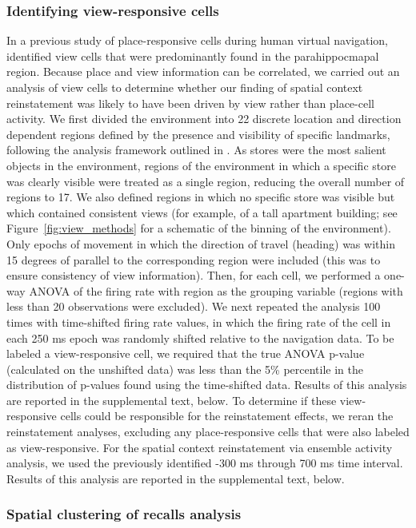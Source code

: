 \subsubsection*{Identifying view-responsive cells}
In a previous study of  place-responsive cells during human virtual navigation, \cite{EkstEtal03} identified view cells that were predominantly found in the parahippocmapal region.  Because place and view information can be correlated, we carried out an analysis of view cells to determine whether our finding of spatial context reinstatement was likely to have been driven by view rather than place-cell activity.  We first divided the environment into 22 discrete location and direction dependent regions defined by the presence and visibility of specific landmarks, following the analysis framework outlined in \cite{EkstEtal03}. As stores were the most salient objects in the environment, regions of the environment in which a specific store was clearly visible were treated as a single region, reducing the overall number of regions to 17. We also defined regions  in which no specific store was visible but which contained consistent views (for example, of a tall apartment building; see Figure~\ref{fig:view_methods} for a schematic of the binning of the environment).  Only epochs of movement in which the direction of travel (heading) was within 15 degrees of parallel to the corresponding region were included (this was to ensure consistency of view information).  Then, for each cell, we performed a one-way ANOVA of the firing rate with region as the grouping variable (regions with less than 20 observations were excluded). We next repeated the analysis 100 times with time-shifted firing rate values, in which the firing rate of the cell in each 250 ms epoch was randomly shifted relative to the navigation data.  To be labeled a view-responsive cell, we required that the true ANOVA p-value (calculated on the unshifted data) was less than the 5\% percentile in the distribution of p-values found using the time-shifted data.  Results of this analysis are reported in the supplemental text, below.  To determine if these view-responsive cells could be responsible for the reinstatement effects, we reran the reinstatement analyses, excluding any place-responsive cells that were also labeled as view-responsive. For the spatial context reinstatement via ensemble activity analysis, we used the previously identified -300 ms through 700 ms time interval.  Results of this analysis are reported in the supplemental text, below.

\subsubsection*{Spatial clustering of recalls analysis}

